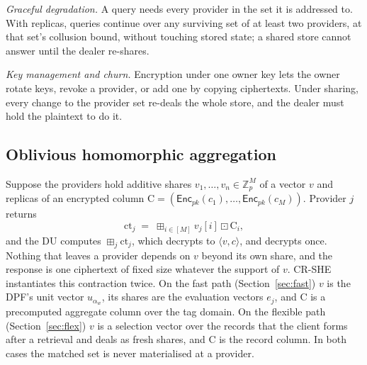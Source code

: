 \documentclass[a4paper,fleqn]{cas-sc}
\newcommand{\Enc}{\mathsf{Enc}}
\newcommand{\bplus}{\boxplus}
\newcommand{\bdot}{\boxdot}
\begin{document}
\emph{Graceful degradation.} A query needs every provider in the set it is
addressed to. With replicas, queries continue over any surviving set of at
least two providers, at that set's collusion bound, without touching stored
state; a shared store cannot answer until the dealer re-shares.

\emph{Key management and churn.} Encryption under one owner key lets the owner
rotate keys, revoke a provider, or add one by copying ciphertexts. Under
sharing, every change to the provider set re-deals the whole store, and the
dealer must hold the plaintext to do it.

\subsection{Oblivious homomorphic aggregation}
\label{sec:oha}
Suppose the providers hold additive shares $v_1,\dots,v_n\in\mathbb{Z}_p^{M}$
of a vector $v$ and replicas of an encrypted column
$\mathrm{C}=(\Enc_{pk}(c_1),\dots,\Enc_{pk}(c_M))$. Provider $j$ returns
\[
\text{ct}_j \;=\; \bplus_{i\in[M]} v_j[i]\bdot \mathrm{C}_i ,
\]
and the DU computes $\bplus_j \text{ct}_j$, which decrypts to
$\langle v,c\rangle$, and decrypts once. Nothing that leaves a provider depends
on $v$ beyond its own share, and the response is one ciphertext of fixed size
whatever the support of $v$. CR-SHE instantiates this contraction twice. On the
fast path (Section~\ref{sec:fast}) $v$ is the DPF's unit vector $u_{\alpha_w}$,
its shares are the evaluation vectors $e_j$, and $\mathrm{C}$ is a precomputed
aggregate column over the tag domain. On the flexible path
(Section~\ref{sec:flex}) $v$ is a selection vector over the records that the
client forms after a retrieval and deals as fresh shares, and $\mathrm{C}$ is
the record column. In both cases the matched set is never materialised at a
provider.
\end{document}
